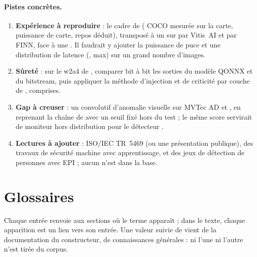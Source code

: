 \documentclass[11pt,a4paper]{article}
\begin{document}
\paragraph{Pistes concrètes.}
\begin{enumerate}
  \item \textbf{Expérience à reproduire} : le cadre de
    \citet[§4.1, Table~1]{arxiv-2304.11580-framework-benchmarking-real-time-embedded}
    ( COCO mesurée sur la carte, puissance de carte, repos déduit), transposé à un
     sur  par Vitis~AI et par FINN, face à une . Il faudrait y
    ajouter la puissance de puce et une distribution de latence (, max) sur un grand
    nombre d'images.
  \item \textbf{Sûreté} : sur le  w2a4 de
    \citet{arxiv-2609.24757-npu-accelerator-quantized-real-time}\pp, comparer bit à bit les
    sorties du modèle QONNX et du bitstream, puis appliquer la méthode d'injection et de
    criticité par couche de
    \citet{2019-libano-selective-hardening-neural-networks-fpgas},  comprises.
  \item \textbf{Gap à creuser} : un  convolutif d'anomalie visuelle sur MVTec AD
    et , en reprenant la chaîne de
    \citet{arxiv-2407.17647-energy-efficient-artefact-detection-accelerator} avec un seuil
    fixé hors du test ; le même score servirait de moniteur hors distribution pour le
    détecteur \deduit.
  \item \textbf{Lectures à ajouter} : ISO/IEC TR~5469 (ou une présentation publique), des
    travaux de sécurité machine avec apprentissage, et des jeux de détection de personnes
    avec EPI ; aucun n'est dans la base.
\end{enumerate}

\appendix
\section*{Glossaires}
Chaque entrée renvoie aux sections où le terme apparaît ; dans le texte, chaque apparition
est un lien vers son entrée. Une valeur suivie de \constr{} vient de la documentation du
constructeur, \horscorpus{} de connaissances générales : ni l'une ni l'autre n'est tirée du
corpus.
\printglossary[type=plateformes]
\printglossary[type=modeles]
\printglossary[type=metriques]



\end{document}

